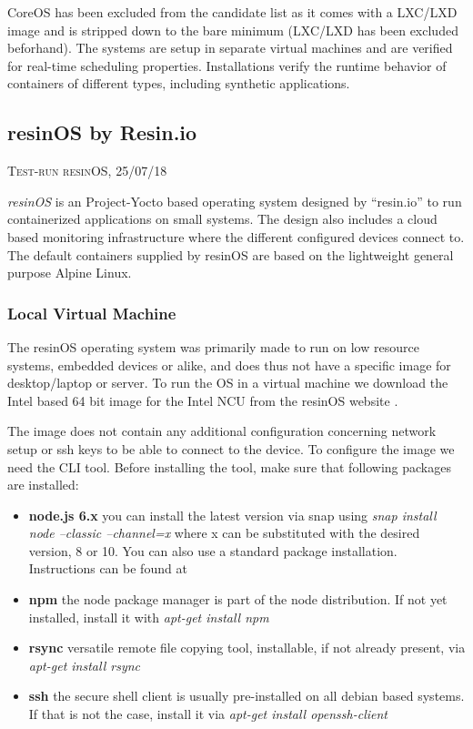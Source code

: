 \documentclass[]{scrartcl}
\begin{document}
CoreOS has been excluded from the candidate list as it comes with a LXC/LXD image and is stripped down to the bare minimum (LXC/LXD has been excluded beforhand). The systems are setup in separate virtual machines and are verified for real-time scheduling properties. Installations verify the runtime behavior of containers of different types, including synthetic applications.

\subsection{resinOS by Resin.io}

{\small\textsc{Test-run resinOS, 25/07/18} \bigskip}

\textit{resinOS} is an Project-Yocto based operating system designed by ``resin.io'' to run containerized applications on small systems. The design also includes a cloud based monitoring infrastructure where the different configured devices connect to. The default containers supplied by resinOS are based on the lightweight general purpose Alpine Linux.

\subsubsection{Local Virtual Machine}

The resinOS operating system was primarily made to run on low resource systems, embedded devices or alike, and does thus not have a specific image for desktop/laptop or server. To run the OS in a virtual machine we download the Intel based 64 bit image for the Intel NCU from the resinOS website \cite{resin01}.

The image does not contain any additional configuration concerning network setup or ssh keys to be able to connect to the device. To configure the image we need the CLI tool. Before installing the tool, make sure that following packages are installed:

\begin{itemize}
	
	\item \textbf{node.js 6.x} you can install the latest version via snap using \textit{snap install node --classic --channel=x} where x can be substituted with the desired version, 8 or 10. You can also use a standard package installation. Instructions can be found at \cite{node01}
	\item \textbf{npm} the node package manager is part of the node distribution. If not yet installed, install it with \textit{apt-get install npm}
	\item \textbf{rsync} versatile remote file copying tool, installable, if not already present, via \textit{apt-get install rsync}
	\item \textbf{ssh} the secure shell client is usually pre-installed on all debian based systems. If that is not the case, install it via \textit{apt-get install openssh-client}
	
\end{itemize}
\end{document}
